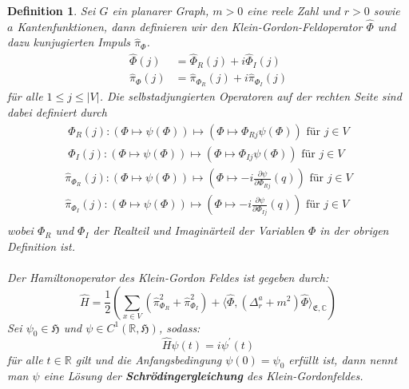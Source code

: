 \documentclass[11pt,a4paper,leqno]{report}
\newtheorem{definition}[theorem]{Definition}
\numberwithin{equation}{chapter}
\begin{document}
\begin{definition}
	Sei $G$ ein planarer Graph, $m>0$ eine reele Zahl und $r>0$ sowie $a$ Kantenfunktionen, dann definieren wir den Klein-Gordon-Feldoperator $\hat{\Phi}$ und dazu kunjugierten Impuls $\hat{\pi}_\Phi$. 
	\begin{align*}
		\hat{\Phi}(j) &= \hat{\Phi}_R(j) + i\hat{\Phi}_I(j)\\
		\hat{\pi}_\Phi(j) &= \hat{\pi}_{\Phi_R}(j) + i\hat{\pi}_{\Phi_I}(j)
	\end{align*}
	f\"ur alle $1\leq j\leq |V|$. Die selbstadjungierten Operatoren auf der rechten Seite sind dabei definiert durch
	\begin{align*}
		\hat{\Phi}_R(j):(\Phi\mapsto\psi(\Phi)) \mapsto (\Phi\mapsto \Phi_{Rj}\psi(\Phi))\text{  f\"ur }j\in V\\
		\hat{\Phi}_I(j):(\Phi\mapsto\psi(\Phi)) \mapsto (\Phi\mapsto \Phi_{Ij}\psi(\Phi))\text{  f\"ur }j\in V
	\end{align*}
	\begin{align*}
		\hat{\pi}_{\Phi_R}(j):(\Phi\mapsto\psi(\Phi)) \mapsto (\Phi\mapsto -i\frac{\partial\psi}{\partial \Phi_{Rj}}(q))\text{  f\"ur }j\in V\\
		\hat{\pi}_{\Phi_I}(j):(\Phi\mapsto\psi(\Phi)) \mapsto (\Phi\mapsto -i\frac{\partial\psi}{\partial \Phi_{Ij}}(q))\text{  f\"ur }j\in V\\
	\end{align*}
	\noindent
	wobei $\Phi_R$ und $\Phi_I$ der Realteil und Imagin\"arteil der Variablen $\Phi$ in der obrigen Definition ist.\\
	\\
	Der Hamiltonoperator des Klein-Gordon Feldes ist gegeben durch:
	\begin{equation}
		\hat{H}=\frac{1}{2}(\sum_{x\in V}(\hat{\pi}_{\Phi_R}^2 + \hat{\pi}_{\Phi_I}^2) + \langle \hat{\Phi}, (\Delta^{a}_r+ m^2)\hat{\Phi}\rangle_{\mathfrak{E},\mathbb{C}})
	\end{equation}
	Sei $\psi_0\in\mathfrak{H}$ und $\psi\in C^1(\mathbb{R},\mathfrak{H})$, sodass:
	\begin{equation}
		\hat{H}\psi(t) = i\psi^\prime(t)
	\end{equation}
	f\"ur alle $t\in\mathbb{R}$ gilt und die Anfangsbedingung $\psi(0)=\psi_0$ erf\"ullt ist, dann nennt man $\psi$ eine L\"osung der
	\textbf{Schr\"odingergleichung} des Klein-Gordonfeldes.
\end{definition}
\noindent
\end{document}
